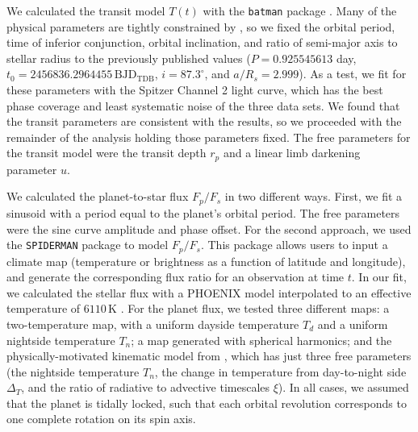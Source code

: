 \documentclass[twocolumn]{aastex61}
\begin{document}
We calculated the transit model $T(t)$ with the \texttt{batman} package \citep{kreidberg15a}. Many of the physical parameters are tightly constrained by \cite{southworth15}, so we fixed the orbital period, time of inferior conjunction, orbital inclination, and ratio of semi-major axis to stellar radius to the previously published values ($P = 0.925545613$ day, $t_0 = 2456836.2964455\,\mathrm{BJD_{TDB}}$, $i = 87.3^\circ$, and $a/R_s = 2.999$). As a test, we fit for these parameters with the Spitzer Channel 2 light curve, which has the best phase coverage and least systematic noise of the three data sets. We found that the transit parameters are consistent with the \cite{southworth15} results, so we proceeded with the remainder of the analysis holding those parameters fixed.  The free parameters for the transit model were the transit depth $r_p$ and a linear limb darkening parameter $u$. 

We calculated the planet-to-star flux $F_p/F_s$ in two different ways. First, we fit a sinusoid with a period equal to the planet's orbital period. The free parameters were the sine curve amplitude and phase offset. For the second approach, we used the \texttt{SPIDERMAN} package \citep{louden17} to model $F_p/F_s$. This package allows users to input a climate map (temperature or brightness as a function of latitude and longitude), and generate the corresponding flux ratio for an observation at time $t$. In our fit, we calculated the stellar flux with a PHOENIX model \citep{husser13} interpolated to an effective temperature of $6110\,\mathrm{K}$ \citep{gillon14}.  For the planet flux, we tested three different maps: a two-temperature map, with a uniform dayside temperature $T_d$ and a uniform nightside temperature $T_n$; a map generated with spherical harmonics; and the physically-motivated kinematic model from \cite{zhang16}, which has just three free parameters (the nightside temperature $T_n$, the change in temperature from day-to-night side $\Delta_T$, and the ratio of radiative to advective timescales $\xi$).  In all cases, we assumed that the planet is tidally locked, such that each orbital revolution corresponds to one complete rotation on its spin axis. 
\end{document}
